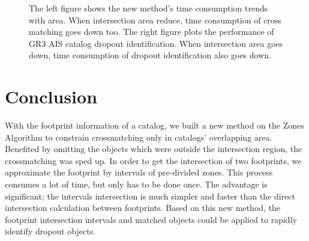 \begin{figure}
\begin{center}
\caption{{The left figure shows the new method's time consumption trends with area. When intersection area reduce, time consumption of cross matching goes down too.} {The right figure plots the performance of GR3 AIS catalog dropout identification. When intersection area goes down, time consumption of dropout identification also goes down.}\label{P046_f4}}
\end{center}
\end{figure}

\section{Conclusion}
With the footprint information of a catalog, we built a new method on the Zones Algorithm to constrain crossmatching only in catalogs' overlapping area. Benefited by omitting the objects which were outside the intersection region, the crossmatching was sped up. In order to get the intersection of two footprints, we approximate the footprint by intervals of pre-divided zones. This process consumes a lot of time, but only has to be done once. The advantage is significant; the intervals intersection is much simpler and faster than the direct intersection calculation between footprints. Based on this new method, the footprint intersection intervals and matched objects could be applied to rapidly identify dropout objects.



